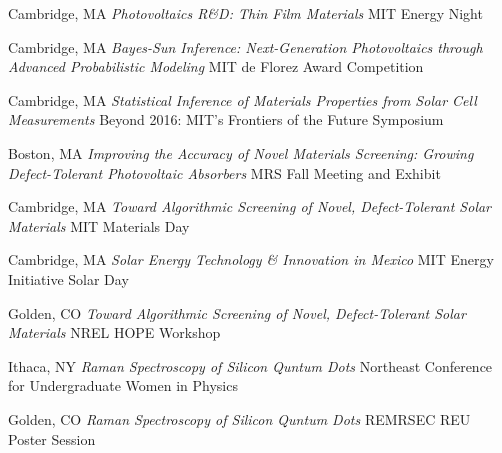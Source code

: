 \vspace{-2mm}
\datedsubsection{}
    {Cambridge, MA}
    {\textit{Photovoltaics R\&D: Thin Film Materials}}
    {MIT Energy Night}

\vspace{-2mm}
\datedsubsection{}
    {Cambridge, MA}
    {\textit{Bayes-Sun Inference: Next-Generation Photovoltaics through Advanced Probabilistic Modeling}}
    {MIT de Florez Award Competition}

\vspace{-2mm}
\datedsubsection{}
    {Cambridge, MA}
    {\textit{Statistical Inference of Materials Properties from Solar Cell Measurements}}
    {Beyond 2016: MIT’s Frontiers of the Future Symposium}

\vspace{-2mm}
    {Boston, MA}
    {\textit{Improving the Accuracy of Novel Materials Screening: Growing Defect-Tolerant Photovoltaic Absorbers}}
    {MRS Fall Meeting and Exhibit}

\vspace{-2mm}
\datedsubsection{}
    {Cambridge, MA}
    {\textit{Toward Algorithmic Screening of Novel, Defect-Tolerant Solar Materials}}
    {MIT Materials Day}

\vspace{-2mm}
\datedsubsection{}
    {Cambridge, MA}
    {\textit{Solar Energy Technology \& Innovation in Mexico}}
    {MIT Energy Initiative Solar Day}

\vspace{-2mm}
\datedsubsection{}
    {Golden, CO}
    {\textit{Toward Algorithmic Screening of Novel, Defect-Tolerant Solar Materials}}
    {NREL HOPE Workshop}

\vspace{-2mm}
    {Ithaca, NY}
    {\textit{Raman Spectroscopy of Silicon Quntum Dots}}
    {Northeast Conference for Undergraduate Women in Physics}

\vspace{-2mm}
    {Golden, CO}
    {\textit{Raman Spectroscopy of Silicon Quntum Dots}}
    {REMRSEC REU Poster Session}